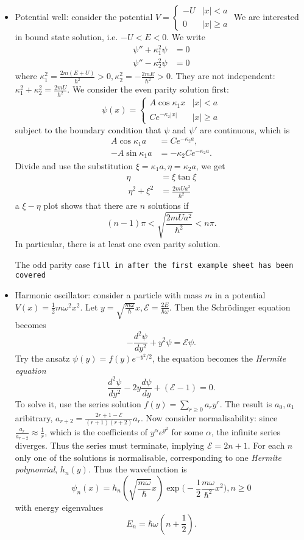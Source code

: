 \documentclass[a4paper]{article}
\theoremstyle{definition}
\begin{document}
\begin{eg}
\begin{itemize}
\item Potential well: consider the potential \(V=
  \begin{cases}
    -U & |x| < a \\
    0 & |x| \geq a
  \end{cases}
  \) We are interested in bound state solution, i.e. \(-U < E < 0\). We write
  \begin{align*}
    \psi'' + \kappa_1^2\psi &= 0 \\
    \psi'' - \kappa_2^2\psi &= 0
  \end{align*}
  where \(\kappa_1^2 = \frac{2m(E+U)}{\hbar^2}>0, \kappa_2^2= -\frac{2mE}{\hbar^2}>0\). They are not independent: \(\kappa_1^2+\kappa_2^2 = \frac{2mU}{\hbar^2}\). We consider the even parity solution first:
  \[
    \psi(x) =
    \begin{cases}
      A\cos \kappa_1 x & |x| < a \\
      Ce^{-\kappa_2|x|} & |x| \geq a
    \end{cases}
  \]
  subject to the boundary condition that \(\psi\) and \(\psi'\) are continuous, which is
  \begin{align*}
    A\cos \kappa_1 a &= Ce^{-\kappa_2a}, \\
    -A\sin \kappa_1 a &= -\kappa_2 Ce^{-\kappa_2a}.
  \end{align*}
  Divide and use the substitution \(\xi=\kappa_1a, \eta = \kappa_2a\), we get
  \begin{align*}
    \eta &= \xi\tan\xi \\\
    \eta^2 + \xi^2 &= \frac{2mUa^2}{\hbar^2}
  \end{align*}
  a \(\xi-\eta\) plot shows that there are \(n\) solutions if
  \[
    (n-1)\pi < \sqrt{\frac{2mUa^2}{\hbar^2}} < n\pi.
  \]
  In particular, there is at least one even parity solution.

  The odd parity case \texttt{fill in after the first example sheet has been covered}
\item Harmonic oscillator: consider a particle with mass \(m\) in a potential \(V(x) = \frac{1}{2}m\omega^2x^2\). Let \(y=\sqrt{\frac{m\omega}{\hbar}}x, \mathcal{E} = \frac{2E}{\hbar\omega}\). Then the Schrödinger equation becomes
  \[
    -\frac{d^2\psi}{dy^2} + y^2\psi = \mathcal{E} \psi.
  \]
  Try the ansatz \(\psi(y) = f(y) e^{-y^2/2}\), the equation becomes the \emph{Hermite equation}
  \[
    \frac{d^2\psi}{dy^2} - 2y \frac{d\psi}{dy} + (\mathcal{E}-1) =0.
  \]
  To solve it, use the series solution \(f(y) = \sum_{r\geq0}a_ry^r\). The result is \(a_0,a_1\) aribitrary, \(a_{r+2} =\frac{2r+1-\mathcal{E}}{(r+1)(r+2)}a_r\). Now consider normalisability: since \(\frac{a_r}{a_{r-2}}\approx \frac{1}{r}\), which is the coefficients of \(y^\alpha e^{y^2}\) for some \(\alpha\), the infinite series diverges. Thus the series must terminate, implying \(\mathcal{E}=2n+1\). For each \(n\) only one of the solutions is normalisable, corresponding to one \emph{Hermite polynomial}, \(h_n(y)\). Thus the wavefunction is
  \[
    \psi_n(x) = h_n(\sqrt{\frac{m\omega}{\hbar}}x)\exp \Big( -\frac{1}{2}\frac{m\omega}{\hbar^2}x^2 \Big), n\geq0
  \]
  with energy eigenvalues
  \[
    E_n=\hbar\omega(n+\frac{1}{2}).
  \]
  

\end{itemize}
\end{eg}
\end{document}
